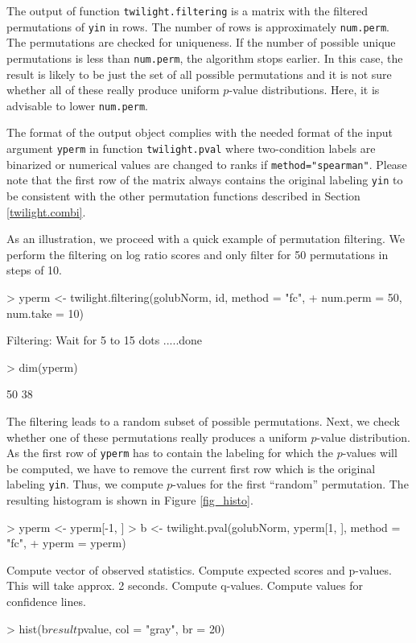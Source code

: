 \documentclass[11pt,a4paper,fleqn]{report}
\newcommand{\Rfunction}[1]{{\texttt{#1}}}
\newcommand{\Rfunarg}[1]{{\texttt{#1}}}
\begin{document}
The output of function \Rfunction{twilight.filtering} is a matrix with the filtered permutations of \Rfunarg{yin} in rows. The number of rows is approximately \Rfunarg{num.perm}. The permutations are checked for uniqueness. If the number of possible unique permutations is less than \Rfunarg{num.perm}, the algorithm stops earlier. In this case, the result is likely to be just the set of all possible permutations and it is not sure whether all of these really produce uniform $p$-value distributions. Here, it is advisable to lower \Rfunarg{num.perm}.

The format of the output object complies with the needed format of the input argument \Rfunarg{yperm} in function \Rfunction{twilight.pval} where two-condition labels are binarized or numerical values are changed to ranks if \Rfunarg{method="spearman"}. Please note that the first row of the matrix always contains the original labeling \Rfunarg{yin} to be consistent with the other permutation functions described in Section \ref{twilight.combi}.
       
As an illustration, we proceed with a quick example of permutation filtering. We perform the filtering on log ratio scores and only filter for 50 permutations in steps of 10.

\begin{Schunk}
\begin{Sinput}
> yperm <- twilight.filtering(golubNorm, id, method = "fc", 
+     num.perm = 50, num.take = 10)
\end{Sinput}
\begin{Soutput}
Filtering: Wait for 5 to 15 dots .....done
\end{Soutput}
\begin{Sinput}
> dim(yperm)
\end{Sinput}
\begin{Soutput}
[1] 50 38
\end{Soutput}
\end{Schunk}

The filtering leads to a random subset of possible permutations. Next, we check whether one of these permutations really produces a uniform $p$-value distribution. As the first row of \Rfunarg{yperm} has to contain the labeling for which the $p$-values will be computed, we have to remove the current first row which is the original labeling \Rfunarg{yin}. Thus, we compute $p$-values for the first ``random'' permutation. The resulting histogram is shown in Figure \ref{fig_histo}.

\begin{Schunk}
\begin{Sinput}
> yperm <- yperm[-1, ]
> b <- twilight.pval(golubNorm, yperm[1, ], method = "fc", 
+     yperm = yperm)
\end{Sinput}
\begin{Soutput}
Compute vector of observed statistics. 
Compute expected scores and p-values. This will take approx. 2 seconds. 
Compute q-values. 
Compute values for confidence lines. 
\end{Soutput}
\begin{Sinput}
> hist(b$result$pvalue, col = "gray", br = 20)
\end{Sinput}
\end{Schunk}
\end{document}
